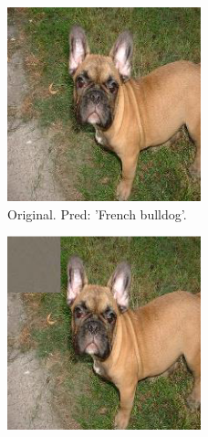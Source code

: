 \begin{figure}[ht]
    \centering
    \begin{subfigure}{0.32\linewidth}
      \includegraphics[width=\linewidth]{figures/patch_original.png}
      \caption{\scriptsize{Original. \newline Pred: 'French bulldog'.}}
      \label{fig:patch_original}
    \end{subfigure}
    \begin{subfigure}{0.32\linewidth}
      \includegraphics[width=\linewidth]{figures/patch_plus_dog.png}

\end{subfigure}
\end{figure}
